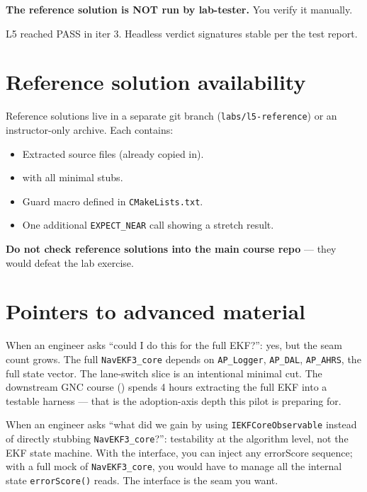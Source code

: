 \documentclass[a4paper,11pt,twoside]{article}
\renewcommand{\insttiming}[1]{\ifinstructor\begin{tcolorbox}[colback=orange!5!white,colframe=orange!50!black,title=Pacing,breakable]#1\end{tcolorbox}\fi}
\renewcommand{\instadvanced}[1]{\ifinstructor\begin{tcolorbox}[colback=violet!5!white,colframe=violet!50!black,title=Advanced material pointer,breakable]#1\end{tcolorbox}\fi}
\begin{document}
\textbf{The reference solution is NOT run by lab-tester.} You verify it manually.

\insttiming{L5 reached PASS in iter 3. Headless verdict signatures stable per the test report.}

\section*{Reference solution availability}

Reference solutions live in a separate git branch (\texttt{labs/l5-reference}) or an instructor-only archive. Each contains:
\begin{itemize}
  \item Extracted source files (already copied in).
  \item {} with all minimal stubs.
  \item Guard macro defined in \texttt{CMakeLists.txt}.
  \item One additional \texttt{EXPECT\_NEAR} call showing a stretch result.
\end{itemize}

\textbf{Do not check reference solutions into the main course repo} --- they would defeat the lab exercise.

\section*{Pointers to advanced material}

\instadvanced{When an engineer asks ``could I do this for the full EKF?'': yes, but the seam count grows. The full \texttt{NavEKF3\_core} depends on \texttt{AP\_Logger}, \texttt{AP\_DAL}, \texttt{AP\_AHRS}, the full state vector. The lane-switch slice is an intentional minimal cut. The downstream GNC course (\siblingplane) spends 4 hours extracting the full EKF into a testable harness --- that is the adoption-axis depth this pilot is preparing for.}

\instadvanced{When an engineer asks ``what did we gain by using \texttt{IEKFCoreObservable} instead of directly stubbing \texttt{NavEKF3\_core}?'': testability at the algorithm level, not the EKF state machine. With the interface, you can inject any errorScore sequence; with a full mock of \texttt{NavEKF3\_core}, you would have to manage all the internal state \texttt{errorScore()} reads. The interface is the seam you want.}

\else
\end{document}
